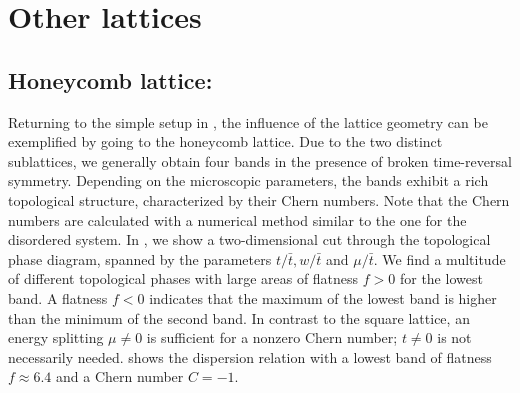 \section{Other lattices}


\subsection{Honeycomb lattice:}
Returning to the simple setup in , the influence of the lattice geometry can be exemplified by going to the honeycomb lattice.
Due to the two distinct sublattices, we generally obtain four bands in the presence of broken time-reversal symmetry.
Depending on the microscopic parameters, the bands exhibit a rich topological structure, characterized by their Chern numbers.
Note that the Chern numbers are calculated with a numerical method similar to the one for the disordered system.
In , we show a two-dimensional cut through the topological phase diagram, spanned by the parameters $t/\bar{t}, w/\bar{t}$ and $\mu/\bar{t}$.
We find a multitude of different topological phases with large areas of flatness $f > 0$ for the lowest band.
A flatness $f < 0$ indicates that the maximum of the lowest band is higher than the minimum of the second band.
In contrast to the square lattice, an energy splitting $\mu \ne 0$ is sufficient for a nonzero Chern number; $t\ne 0$ is not necessarily needed.
 shows the dispersion relation with a lowest band of flatness $f\approx 6.4$ and a Chern number $C=-1$.


